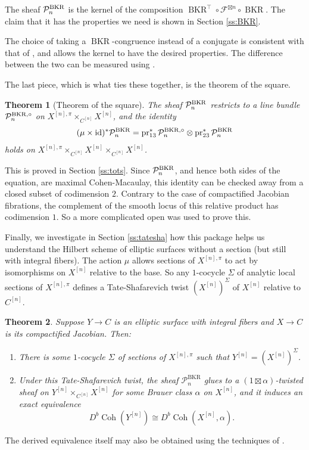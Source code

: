 \documentclass{amsart}
\theoremstyle{plain}
\newtheorem{theorem}{Theorem}[section]
\theoremstyle{definition}
\theoremstyle{remark}
\begin{document}
    The sheaf $\mathcal P_n^{\rm BKR}$ is the kernel of the composition $\operatorname{BKR}^\top\circ\mathcal F^{\boxtimes n}\circ\operatorname{BKR}$.
    The claim that it has the properties we need is shown in Section \ref{ss:BKR}.

    The choice of taking a $\operatorname{BKR}$-congruence instead of a conjugate is consistent with that of \cite{groec,markman24}, and allows the kernel to have the desired properties.
    The difference between the two can be measured using \cite[Eq.~(11.5)]{markman24}.

    The last piece, which is what ties these together, is the theorem of the square.
    \begin{theorem}[Theorem of the square]
        The sheaf $\mathcal P_n^{\rm BKR}$ restricts to a line bundle $\mathcal P_n^{\rm BKR,\circ}$ on ${X^{[n],\pi}\times_{C^{[n]}}X^{[n]}}$, and the identity
        \[(\mu\times\operatorname{id})^\ast\mathcal P^{\rm BKR}_n=\operatorname{pr}_{13}^\ast\mathcal P^{\rm BKR,\circ}_n\otimes\operatorname{pr}_{23}^\ast\mathcal P^{\rm BKR}_n\]
        holds on $X^{[n],\pi}\times_{C^{[n]}}X^{[n]}\times_{C^{[n]}}X^{[n]}$.
    \end{theorem}
    This is proved in Section \ref{ss:tots}.
    Since $\mathcal P_n^{\rm BKR}$, and hence both sides of the equation, are maximal Cohen-Macaulay, this identity can be checked away from a closed subset of codimension $2$.
    Contrary to the case of compactified Jacobian fibrations, the complement of the smooth locus of this relative product has codimension $1$.
    So a more complicated open was used to prove this.

    Finally, we investigate in Section \ref{ss:tatesha} how this package helps us understand the Hilbert scheme of elliptic surfaces without a section (but still with integral fibers).
    The action $\mu$ allows sections of $X^{[n],\pi}$ to act by isomorphisms on $X^{[n]}$ relative to the base.
    So any $1$-cocycle $\Sigma$ of analytic local sections of $X^{[n],\pi}$ defines a Tate-Shafarevich twist $(X^{[n]})^\Sigma$ of $X^{[n]}$ relative to $C^{[n]}$.
    \begin{theorem}
        Suppose $Y\to C$ is an elliptic surface with integral fibers and $X\to C$ is its compactified Jacobian.
        Then:
        \begin{enumerate}
            \item There is some $1$-cocycle $\Sigma$ of sections of $X^{[n],\pi}$ such that $Y^{[n]}=(X^{[n]})^\Sigma$.
            \item Under this Tate-Shafarevich twist, the sheaf $\mathcal P_n^{\operatorname{BKR}}$ glues to a $(1\boxtimes\alpha)$-twisted sheaf on $Y^{[n]}\times_{C^{[n]}}X^{[n]}$ for some Brauer class $\alpha$ on $X^{[n]}$, and it induces an exact equivalence
            \[D^b\operatorname{Coh}(Y^{[n]})\cong D^b\operatorname{Coh}(X^{[n]},\alpha).\]
        \end{enumerate}
    \end{theorem}
    The derived equivalence itself may also be obtained using the techniques of \cite{bothuy}.
\end{document}
